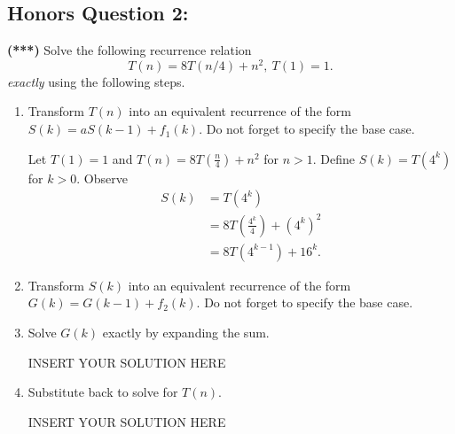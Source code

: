 \subsection*{Honors Question 2:}
{\bf (***)} Solve the following recurrence relation
\begin{equation*}
T(n)=8T\left(n/4\right)+n^2,~T(1)=1.
\end{equation*}
\emph{exactly} using the following steps.
\begin{enumerate}
\item %
Transform $T(n)$ into an equivalent	recurrence of the form $S(k) = a S(k-1) + f_1(k)$. Do not forget to specify the base case.
\begin{solution}
Let $T(1)=1$ and $T(n)=8T\left(\frac{n}{4}\right)+n^2$ for $n>1$. Define $S(k)=T(4^k)$ for $k>0$. Observe
\begin{align*}
S(k)&=T(4^k)\\
&=8T\left(\frac{4^k}{4}\right)+(4^k)^2\\
&=8T(4^{k-1})+{16}^k.
\end{align*}
\end{solution}
\item %
Transform $S(k)$ into an equivalent	recurrence of the form $G(k) = G(k-1) + f_2(k)$. Do not forget to specify the base case.
\begin{solution}
\end{solution}
	
	\item %
	Solve $G(k)$ exactly by expanding the sum.
	
\begin{solution}   INSERT YOUR SOLUTION HERE   \end{solution}

	\item %
	Substitute back to solve for $T(n)$.
	
\begin{solution}   INSERT YOUR SOLUTION HERE   \end{solution}
\end{enumerate}

